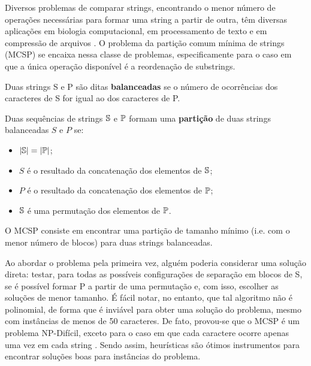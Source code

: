 Diversos problemas de comparar strings, encontrando o menor número de operações necessárias para formar uma string a partir de outra, têm diversas aplicações em biologia computacional, em processamento de texto e em compressão de arquivos \cite{goldstein_minimum_2005}. O problema da partição comum mínima de strings (MCSP) se encaixa nessa classe de problemas, especificamente para o caso em que a única operação disponível é a reordenação de substrings. 

\begin{definition}
    Duas strings S e P são ditas \textbf{balanceadas} se o número de ocorrências dos caracteres de S for igual ao dos caracteres de P. 
\end{definition}

\begin{definition}
    Duas sequências de strings $\S$ e $\P$ formam uma \textbf{partição} de duas strings balanceadas $S$ e $P$ se: \cite[p.~69]{siqueira_heuristicas_2022}
    \begin{itemize}
        \item $|\S| = |\P|$;
        \item $S$ é o resultado da concatenação dos elementos de $\S$;
        \item $P$ é o resultado da concatenação dos elementos de $\P$;
        \item $\S$ é uma permutação dos elementos de $\P$.
    \end{itemize}
\end{definition}

O MCSP consiste em encontrar uma partição de tamanho mínimo (i.e. com o menor número de blocos) para duas strings balanceadas.

Ao abordar o problema pela primeira vez, alguém poderia considerar uma solução direta: testar, para todas as possíveis configurações de separação em blocos de S, se é possível formar P a partir de uma permutação e, com isso, escolher as soluções de menor tamanho. É fácil notar, no entanto, que tal algoritmo não é polinomial, de forma que é inviável para obter uma solução do problema, mesmo com instâncias de menos de 50 caracteres. De fato, provou-se que o MCSP é um problema NP-Difícil, exceto para o caso em que cada caractere ocorre apenas uma vez em cada string \cite{goldstein_minimum_2005}. Sendo assim, heurísticas são ótimos instrumentos para encontrar soluções boas para instâncias do problema.
